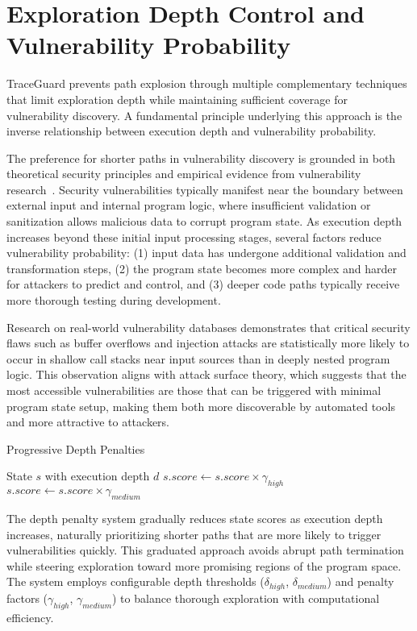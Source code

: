 \section{Exploration Depth Control and Vulnerability Probability}\label{sec:exploration_depth_control}

TraceGuard prevents path explosion through multiple complementary techniques that limit exploration depth while maintaining sufficient coverage for vulnerability discovery. A fundamental principle underlying this approach is the inverse relationship between execution depth and vulnerability probability.

The preference for shorter paths in vulnerability discovery is grounded in both theoretical security principles and empirical evidence from vulnerability research~\cite{schwartz_all_2010}. Security vulnerabilities typically manifest near the boundary between external input and internal program logic, where insufficient validation or sanitization allows malicious data to corrupt program state. As execution depth increases beyond these initial input processing stages, several factors reduce vulnerability probability: (1) input data has undergone additional validation and transformation steps, (2) the program state becomes more complex and harder for attackers to predict and control, and (3) deeper code paths typically receive more thorough testing during development.

Research on real-world vulnerability databases demonstrates that critical security flaws such as buffer overflows and injection attacks are statistically more likely to occur in shallow call stacks near input sources than in deeply nested program logic. This observation aligns with attack surface theory, which suggests that the most accessible vulnerabilities are those that can be triggered with minimal program state setup, making them both more discoverable by automated tools and more attractive to attackers.

\begin{algorithm}[H]
    \caption{Progressive Depth Penalties}\label{alg:depth_penalties}
\begin{algorithmic}[1]
\Require State $s$ with execution depth $d$
    \State $s.score \gets s.score \times \gamma_{high}$
    \State $s.score \gets s.score \times \gamma_{medium}$
\EndIf
\end{algorithmic}
\end{algorithm}

The depth penalty system gradually reduces state scores as execution depth increases, naturally prioritizing shorter paths that are more likely to trigger vulnerabilities quickly. This graduated approach avoids abrupt path termination while steering exploration toward more promising regions of the program space. The system employs configurable depth thresholds ($\delta_{high}$, $\delta_{medium}$) and penalty factors ($\gamma_{high}$, $\gamma_{medium}$) to balance thorough exploration with computational efficiency.

